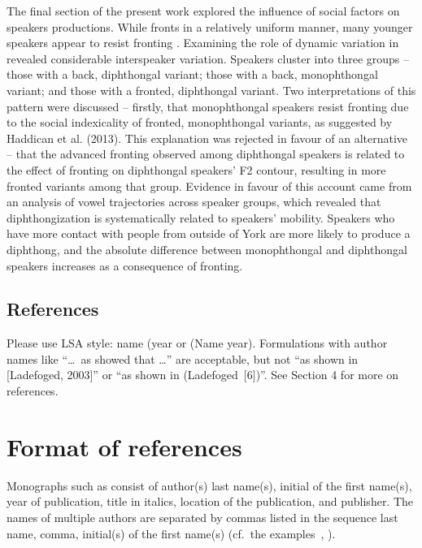 \documentclass[12pt]{article}
\begin{document}
The final section of the present work explored the influence of social factors on speakers  productions. While  fronts in a relatively uniform manner, many younger speakers appear to resist fronting . Examining the role of dynamic variation in  revealed considerable interspeaker variation. Speakers cluster into three groups -- those with a back, diphthongal variant; those with a back, monophthongal variant; and those with a fronted, diphthongal variant. Two interpretations of this pattern were discussed -- firstly, that monophthongal speakers resist fronting due to the social indexicality of fronted, monophthongal variants, as suggested by Haddican et al. (2013). This explanation was rejected in favour of an alternative -- that the advanced fronting observed among diphthongal speakers is related to the effect of fronting on diphthongal speakers' F2 contour, resulting in more fronted variants among that group. Evidence in favour of this account came from an analysis of vowel trajectories across speaker groups, which revealed that diphthongization is systematically related to speakers' mobility. Speakers who have more contact with people from outside of York are more likely to produce a diphthong, and the absolute difference between monophthongal and diphthongal speakers increases as a consequence of fronting.


\subsection{References}

Please use LSA style: name (year or (Name year). Formulations
with author names like ``\ldots\ as 
showed that \ldots'' are acceptable, but not ``as shown in [Ladefoged,
2003]'' or ``as shown in (Ladefoged~[6])''. See Section 4 for more on references.


\section{Format of references}

Monographs such as  consist of author(s) last name(s),
initial of the first name(s), year of publication, title in italics, location of the publication, and publisher. The names of multiple authors are separated by commas listed in the 
sequence last name, comma, initial(s) of the first name(s) (cf.\ the examples~, ). 
\end{document}

